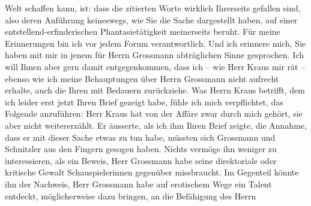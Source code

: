\begin{ledgroupsized}[t]{13cm}
               Welt schaffen kann, ist: dass die zitierten Worte wirklich Ihrerseits gefallen sind,
               also deren Anführung keineswegs, wie Sie die Sache dargestellt haben, auf einer
               entstellend-erfinderischen Phantasietätigkeit meinerseits beruht. Für meine
               Erinnerungen bin ich vor jedem Forum verantwortlich. Und ich erinnere mich, Sie haben
               mit mir in jenem für Herrn Grossmann
               abträglichen Sinne gesprochen. Ich will Ihnen aber gern damit entgegenkommen, dass
               ich – wie Herr Kraus mir rät – ebenso wie ich
               meine Behauptungen über Herrn Grossmann nicht
               aufrecht erhalte, auch die Ihren mit Bedauern zurückziehe.\pend
           \pstart
           Was Herrn Kraus betrifft, dem ich leider erst
               jetzt Ihren Brief gezeigt habe, fühle ich mich verpflichtet, das Folgende anzuführen:
               Herr Kraus hat von der Affäre zwar durch mich
               gehört, sie aber nicht weitererzählt. Er äusserte, als ich ihm Ihren Brief zeigte,
               die Annahme, dass er mit dieser Sache etwas zu tun habe, müssten sich Grossmann und Schnitzler aus den Fingern
               gesogen haben. Nichts vermöge ihn weniger zu interessieren, als ein Beweis, Herr Grossmann habe seine direktoriale oder
               kritische Gewalt Schauspielerinnen gegenüber missbraucht. Im Gegenteil könnte ihn der
               Nachweis, Herr Grossmann habe auf erotischem
               Wege ein Talent entdeckt, möglicherweise dazu bringen, an die Befähigung des Herrn

\end{ledgroupsized}
